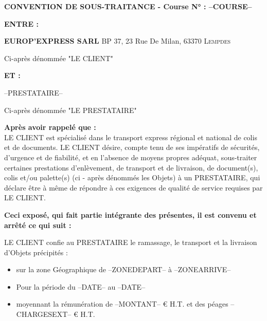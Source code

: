 \documentclass[a4paper, oneside, 8pt, french]{article}
\begin{document}
\begin{center}
\large \bf CONVENTION DE SOUS-TRAITANCE - Course N° : --COURSE--
\end{center}

\begin{fminipage}
\begin{minipage}[t]{0.10\textwidth}
\textbf{ENTRE :} 
\end{minipage}
\hspace{2mm}
\begin{minipage}[t]{0.88\textwidth}
\textbf{EUROP'EXPRESS SARL} \hspace{0.5cm} BP 37, 23 Rue De Milan, \textsc{63370 Lempdes}
\vspace{-10px}
\begin{flushright}
{\small Ci-après dénommée "LE CLIENT"}
\end{flushright}
\end{minipage}

\begin{minipage}[t]{0.10\textwidth}\textbf 
\textbf{ET :} 
\end{minipage}
\hspace{2mm}
\begin{minipage}[t]{0.89\textwidth}
--PRESTATAIRE--
\vspace{-10px}
\begin{flushright}
{\small Ci-après dénommée "LE PRESTATAIRE"}
\end{flushright}
\end{minipage}
\end{fminipage}

\textbf {Après avoir rappelé que :}\\
LE CLIENT  est spécialisé dans le transport express régional et national de colis et de documents. LE CLIENT désire, compte tenu de ses  impératifs de sécurités, d'urgence et de fiabilité, et en l'absence de moyens propres adéquat, sous-traiter certaines prestations d'enlèvement, de transport et de livraison, de document(s), colis et/ou palette(s) (ci - après dénommés les Objets) à un PRESTATAIRE, qui déclare être à même de répondre à ces exigences de qualité de service requises par LE CLIENT.

\textbf{Ceci exposé, qui fait partie intégrante des présentes, il est convenu et arrêté ce qui suit :}\\
\begin{fminipage}
{LE CLIENT confie au PRESTATAIRE le ramassage, le transport et la livraison d'Objets précipités :}
\begin{itemize}
\item[\textbullet]sur la zone Géographique de --ZONEDEPART-- à --ZONEARRIVE--
\item[\textbullet]Pour la période du --DATE-- au --DATE--
\item[\textbullet]moyennant la rémunération de --MONTANT-- € H.T. et des péages --CHARGESEXT-- € H.T.
\end{itemize}
\end{fminipage}
\end{document}
